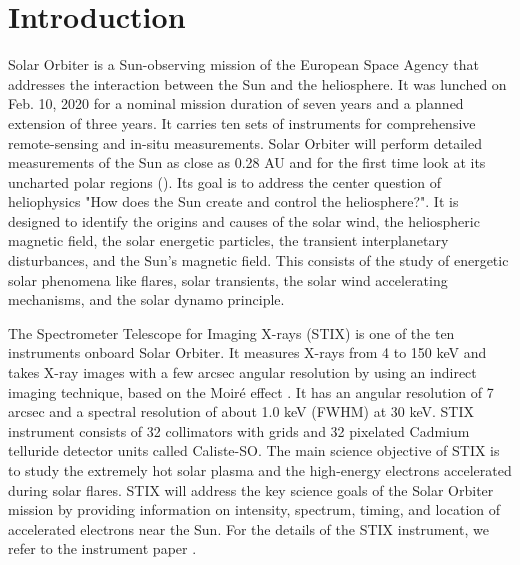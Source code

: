 \documentclass{aa}
\begin{document}
   \maketitle
%

\section{Introduction}
Solar Orbiter is a Sun-observing mission of the European Space  Agency that 
addresses the interaction between the Sun and the heliosphere.
It was lunched on Feb. 10, 2020 for a nominal mission duration of seven years and a planned 
extension of
three years. It carries ten sets of instruments for comprehensive
remote-sensing and in-situ measurements. 
Solar Orbiter  will perform detailed measurements of the Sun as close as 0.28 AU and for the first time look at its uncharted polar regions (\cite{SolarOrbiter2020}).  
Its goal is to  address the center question of heliophysics  "How does the Sun create and control the heliosphere?".  It is designed to identify the origins and causes of the solar wind, the heliospheric magnetic field, the solar energetic particles, the transient interplanetary disturbances, and the Sun's magnetic field.
This consists of the study of energetic solar phenomena like flares,  solar transients,  the solar wind accelerating mechanisms, and the solar dynamo principle.  


The Spectrometer Telescope for Imaging X-rays (STIX) is one of the ten instruments onboard Solar Orbiter.  It measures X-rays from 4 to 150 keV and takes X-ray images with a few arcsec angular resolution by using an indirect imaging technique, based on the Moiré effect .  It has an angular resolution of 7 arcsec and a spectral resolution of  about 1.0 keV (FWHM) at 30 keV.
STIX instrument consists of 32 collimators with
grids and 32 pixelated Cadmium telluride  detector units called Caliste-SO.
The main science objective of STIX is to study the extremely hot solar plasma and the high-energy electrons accelerated during solar flares. STIX will address the key science goals of the Solar Orbiter mission by providing information on intensity, spectrum, timing, and location of accelerated electrons near the Sun.
For the details of the STIX instrument, we refer to the instrument paper \cite{StixInstrument}.
\end{document}
